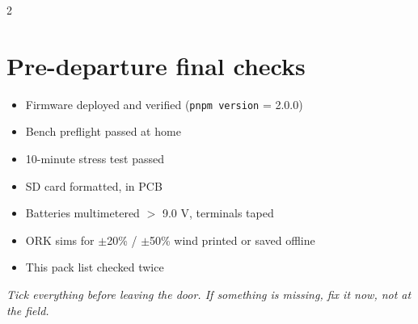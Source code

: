 \documentclass[10pt,a4paper]{article}
\begin{document}
\begin{multicols}{2}
\section*{Pre-departure final checks}
\begin{itemize}
  \item Firmware deployed and verified (\texttt{pnpm version} = 2.0.0)
  \item Bench preflight passed at home
  \item 10-minute stress test passed
  \item SD card formatted, in PCB
  \item Batteries multimetered $>$ 9.0 V, terminals taped
  \item ORK sims for $\pm$20\% / $\pm$50\% wind printed or saved offline
  \item This pack list checked twice
\end{itemize}

\end{multicols}

\vspace{4pt}
\begin{center}
  {\sffamily\small\color{linegrey}\itshape Tick everything before leaving the door. If something is missing, fix it now, not at the field.}
\end{center}
\end{document}
